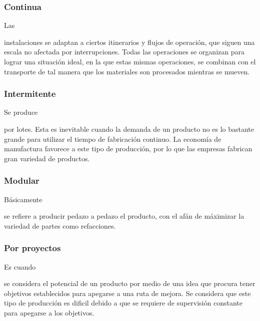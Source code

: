 \documentclass[stu, 12pt, letterpaper, donotrepeattitle, floatsintext, natbib]{apa7}
\begin{document}
\subsubsection{Continua}
Las \begin{justifying}
    instalaciones se adaptan a ciertos itinerarios y flujos de operación, que siguen una escala no afectada por interrupciones. Todas las operaciones
    se organizan para lograr una situación ideal, en la que estas mismas operaciones, se combinan con el transporte de tal manera que los materiales
    son procesados mientras se mueven.\par
\end{justifying}
\vspace{\baselineskip}
\subsubsection{Intermitente}
Se produce \begin{justifying}
    por lotes. Esta es inevitable cuando la demanda de un producto no es lo bastante grande para utilizar el tiempo de fabricación continuo. 
    La economía de manufactura favorece a este tipo de producción, por lo que las empresas fabrican gran variedad de productos.\par
\end{justifying}
\subsubsection{Modular}
Básicamente \begin{justifying}
    se refiere a producir pedazo a pedazo el producto, con el afán de máximizar la variedad de partes como refacciones.\par
\end{justifying}
\vspace{\baselineskip}
\subsubsection{Por proyectos}
Es cuando \begin{justifying}
    se considera el potencial de un producto por medio de una idea que procura tener objetivos establecidos para apegarse a una ruta de mejora. Se considera que
    este tipo de producción es dificil debido a que se requiere de supervisión constante para apegarse a los objetivos.\par
\end{justifying}
\vspace{\baselineskip}
\end{document}
